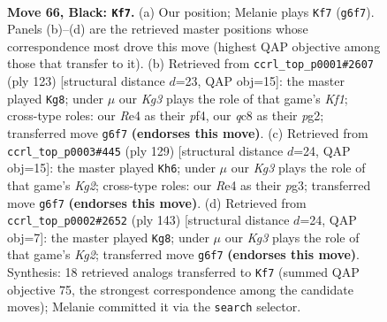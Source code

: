 \documentclass[11pt]{article}
\begin{document}
\clearpage

\begin{figure}[p]\centering
\begin{subfigure}{0.46\textwidth}\centering
\resizebox{\linewidth}{!}{%
\newchessgame
\chessboard[
  setfen={2Q5/8/5pkq/3p4/4r3/6P1/6KP/8 b - - 13 66},
  showmover=false,
  pgfstyle=straightmove, color=movearrow, markmove={g6-f7}
]}
\caption{}
\end{subfigure}\hfill
\begin{subfigure}{0.46\textwidth}\centering
\resizebox{\linewidth}{!}{%
\newchessgame
\chessboard[
  setfen={5k2/6p1/7p/8/3Q1P2/q6P/6PK/8 b - - 17 62},
  showmover=false,
  pgfstyle=straightmove, color=movearrow, markmove={f8-g8}
]}
\caption{}
\end{subfigure}
\\[4pt]
\begin{subfigure}{0.46\textwidth}\centering
\resizebox{\linewidth}{!}{%
\newchessgame
\chessboard[
  setfen={8/3q2kp/5p2/8/8/6P1/2Q2P1K/8 b - - 19 65},
  showmover=false,
  pgfstyle=straightmove, color=movearrow, markmove={g7-h6}
]}
\caption{}
\end{subfigure}\hfill
\begin{subfigure}{0.46\textwidth}\centering
\resizebox{\linewidth}{!}{%
\newchessgame
\chessboard[
  setfen={8/3q2k1/5p2/8/pQ4P1/5P2/6K1/8 b - - 1 72},
  showmover=false,
  pgfstyle=straightmove, color=movearrow, markmove={g7-g8}
]}
\caption{}
\end{subfigure}
\caption{\textbf{Move 66, Black: \texttt{Kf7}.} (a) Our position; Melanie plays \texttt{Kf7} (\texttt{g6f7}). Panels (b)--(d) are the retrieved master positions whose correspondence most drove this move (highest QAP objective among those that transfer to it). (b) Retrieved from \texttt{ccrl\_top\_p0001\#2607} (ply 123) [structural distance $d$=23, QAP obj=15]: the master played \texttt{Kg8}; under $\mu$ our \emph{Kg3} plays the role of that game's \emph{Kf1}; cross-type roles: our \emph{R}e4 as their \emph{p}f4, our \emph{q}c8 as their \emph{p}g2; transferred move \texttt{g6f7} \textbf{(endorses this move)}. (c) Retrieved from \texttt{ccrl\_top\_p0003\#445} (ply 129) [structural distance $d$=24, QAP obj=15]: the master played \texttt{Kh6}; under $\mu$ our \emph{Kg3} plays the role of that game's \emph{Kg2}; cross-type roles: our \emph{R}e4 as their \emph{p}g3; transferred move \texttt{g6f7} \textbf{(endorses this move)}. (d) Retrieved from \texttt{ccrl\_top\_p0002\#2652} (ply 143) [structural distance $d$=24, QAP obj=7]: the master played \texttt{Kg8}; under $\mu$ our \emph{Kg3} plays the role of that game's \emph{Kg2}; transferred move \texttt{g6f7} \textbf{(endorses this move)}. Synthesis: 18 retrieved analogs transferred to \texttt{Kf7} (summed QAP objective 75, the strongest correspondence among the candidate moves); Melanie committed it via the \texttt{search} selector.}
\label{fig:thought-m131}
\end{figure}
\end{document}
